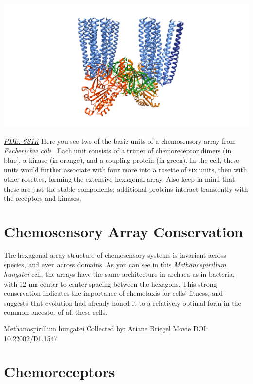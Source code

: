 \documentclass[]{tufte-book}
\begin{document}
\includegraphics{img/schematics/7_2_1}

\href{http://rcsb.org/structure/6S1K}{\emph{PDB: 6S1K}}
Here you see two of the basic units of a chemosensory array from \emph{Escherichia coli} \citep{cassidy2020}. Each unit consists of a trimer of chemoreceptor dimers (in blue), a kinase (in orange), and a coupling protein (in green). In the cell, these units would further associate with four more into a rosette of six units, then with other rosettes, forming the extensive hexagonal array. Also keep in mind that these are just the stable components; additional proteins interact transiently with the receptors and kinases.

\hypertarget{chemosensory-array-conservation}{%
\section{Chemosensory Array Conservation}\label{chemosensory-array-conservation}}

The hexagonal array structure of chemosensory systems is invariant across species, and even across domains. As you can see in this \emph{Methanospirillum hungatei} cell, the arrays have the same architecture in archaea as in bacteria, with 12 nm center-to-center spacing between the hexagons. This strong conservation indicates the importance of chemotaxis for cells' fitness, and suggests that evolution had already honed it to a relatively optimal form in the common ancestor of all these cells.



\hypertarget{htmlwidget-fa094e51e1d948129844}{}

\label{fig:7-3}\protect\hyperlink{tree}{Methanospirillum hungatei} Collected by: \protect\hyperlink{ariane_briegel}{Ariane Briegel} Movie DOI: \href{https://doi.org/10.22002/D1.1547}{10.22002/D1.1547}

\hypertarget{chemoreceptors}{%
\section{Chemoreceptors}\label{chemoreceptors}}
\end{document}
